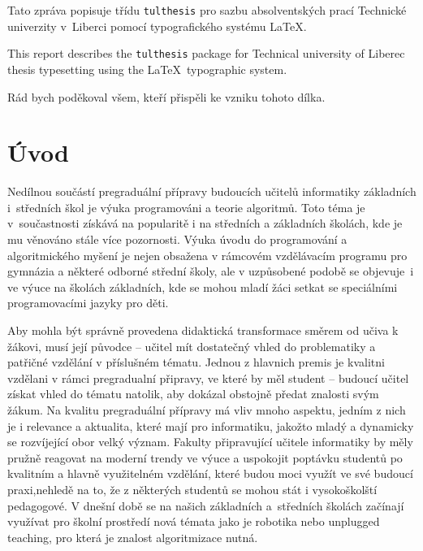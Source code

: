 \documentclass[FP,DP]{tulthesis}
\begin{document}

\begin{abstractCZ}
Tato zpráva popisuje třídu \texttt{tulthesis} pro sazbu absolventských prací
Technické univerzity v~Liberci pomocí typografického systému \LaTeX.
\end{abstractCZ}

\vspace{2cm}

\begin{abstractEN}
This report describes the \texttt{tulthesis} package for Technical university of
Liberec thesis typesetting using the \LaTeX\ typographic system.
\end{abstractEN}

\clearpage

\begin{acknowledgement}
Rád bych poděkoval všem, kteří přispěli ke vzniku tohoto dílka.
\end{acknowledgement}

\tableofcontents

\clearpage

\chapter{Úvod}
Nedílnou součástí pregraduální přípravy budoucích učitelů informatiky základních i~středních škol je výuka programováni a teorie algoritmů. Toto téma je v~součastnosti získává na popularitě i na středních a základních školách, kde je mu věnováno stále více pozornosti. Výuka úvodu do programování a algoritmického myšení je nejen obsažena v rámcovém vzdělávacím programu pro gymnázia a některé odborné střední školy, ale v uzpůsobené podobě se objevuje~i ve výuce na školách základních, kde se mohou mladí žáci setkat se speciálními programovacími jazyky pro děti.

Aby mohla být správně provedena didaktická transformace směrem od učiva k žákovi, musí její původce -- učitel mít dostatečný vhled do problematiky a patřičné vzdělání v příslušném tématu. Jednou z hlavnich premis je kvalitni vzdělani v rámci pregradualní připravy, ve které by měl student -- budoucí učitel získat vhled do tématu natolik, aby dokázal obstojně předat znalosti svým žákum. Na kvalitu pregraduální přípravy má vliv mnoho aspektu, jedním z nich je i relevance a aktualita, které mají pro informatiku, jakožto mladý a dynamicky se rozvíjející obor velký význam. Fakulty připravující učitele informatiky by měly pružně reagovat na moderní trendy ve výuce a uspokojit poptávku studentů po kvalitním a hlavně využitelném vzdělání, které budou moci využít ve své budoucí praxi,nehledě na to, že z některých studentů se mohou stát i vysokoškolští pedagogové.  V dnešní době se na našich základních a~středních školách začínají využívat pro školní prostředí nová témata jako je robotika nebo unplugged teaching, pro která je znalost algoritmizace nutná. 
\end{document}
